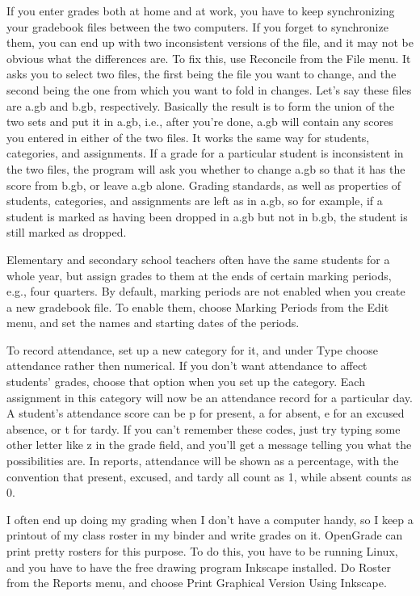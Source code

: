 \documentclass{opengrade_doc}
\begin{document}
If you enter grades both at home and at work, you have to keep synchronizing
your gradebook files between the two computers. If you forget to synchronize
them, you can end up with two inconsistent versions of the file, and it may
not be obvious what the differences are. To fix this, use Reconcile from the
File menu. It asks you to select two files, the first being the file you
want to change, and the second being the one from which you want to fold
in changes. Let's say these files are a.gb and b.gb, respectively. Basically
the result is to form the union of the two sets and put it in a.gb, i.e.,
after you're done, a.gb will contain any scores you entered in either of
the two files. It works the same way for students, categories, and assignments.
If a grade for a particular student is inconsistent in the two files, the program
will ask you whether to change a.gb so that it has the score from b.gb, or
leave a.gb alone. Grading standards, as well as properties of students, categories, and assignments are
left as in a.gb, so for example, if a student is marked as having been dropped
in a.gb but not in b.gb, the student is still marked as dropped. 

Elementary and secondary school teachers often have the same students for a whole year,
but assign grades to them at the ends of certain marking periods, e.g., four quarters.
By default, marking periods are not enabled when you create a new gradebook file.
To enable them, choose Marking Periods from the Edit menu, and set the names and starting
dates of the periods.

To record attendance, set up a new category for it, and under Type choose attendance
rather then numerical. If you don't want attendance to affect students' grades,
choose that option when you set up the category. Each assignment in this category will now be an attendance
record for a particular day. A student's attendance score can be p for present,
a for absent, e for an excused absence, or t for tardy. If you can't remember these
codes, just try typing some other letter like z in the grade field, and you'll get
a message telling you what the possibilities are. In reports, attendance will be
shown as a percentage, with the convention that present, excused, and tardy all
count as 1, while absent counts as 0.

I often end up doing my grading when I don't have a computer handy, so I keep a printout
of my class roster in my binder and write grades on it. OpenGrade can print pretty
rosters for this purpose. To do this, you have to be running Linux, and you have to
have the free drawing program Inkscape installed. Do Roster from the Reports menu,
and choose Print Graphical Version Using Inkscape.
\end{document}
